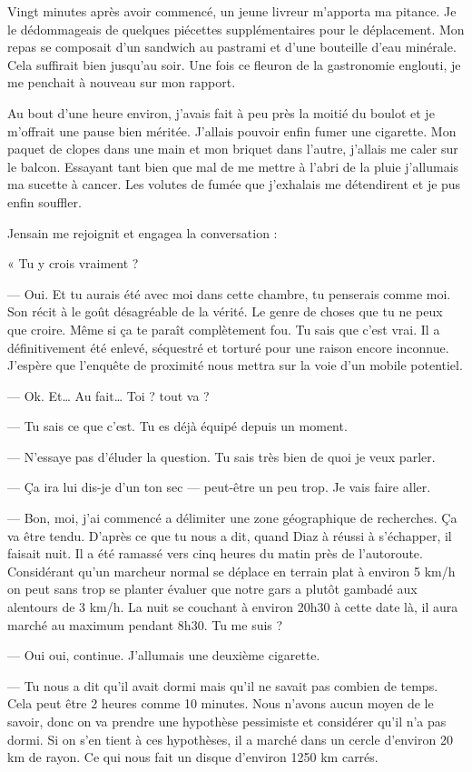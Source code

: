 Vingt minutes après avoir commencé, un jeune livreur m'apporta ma pitance. Je le dédommageais de quelques piécettes 
supplémentaires pour le déplacement. Mon repas se composait d'un sandwich au pastrami et d'une bouteille d'eau 
minérale. Cela suffirait bien jusqu'au soir. Une fois ce fleuron de la gastronomie englouti, je me penchait à 
nouveau sur mon rapport.

Au bout d'une heure environ, j'avais fait à peu près la moitié du boulot et je m'offrait une pause bien méritée. 
J'allais pouvoir enfin fumer une cigarette. Mon paquet de clopes dans une main et mon briquet dans l'autre, j'allais me 
caler sur le balcon. Essayant tant bien que mal de me mettre à l'abri de la pluie j'allumais ma sucette à cancer. Les 
volutes de fumée que j'exhalais me détendirent et je pus enfin souffler. 

Jensain me rejoignit et engagea la conversation :

« Tu y crois vraiment ?

— Oui. Et tu aurais été avec moi dans cette chambre, tu penserais comme moi. Son récit à le goût désagréable de la 
vérité. Le genre de choses que tu ne peux que croire. Même si ça te paraît complètement fou. Tu sais que c'est vrai. Il 
a définitivement été enlevé, séquestré et torturé pour une raison encore inconnue. J'espère que l'enquête de proximité 
nous mettra sur la voie d'un mobile potentiel.

— Ok. Et… Au fait… Toi ? tout va ?

— Tu sais ce que c'est. Tu es déjà équipé depuis un moment.

— N'essaye pas d'éluder la question. Tu sais très bien de quoi je veux parler.

— Ça ira lui dis-je d'un ton sec — peut-être un peu trop. Je vais faire aller. 

— Bon, moi, j'ai commencé a délimiter une zone géographique de recherches. Ça va être tendu. D'après ce que tu nous a 
dit, quand Diaz à réussi à s'échapper, il faisait nuit. Il a été ramassé vers cinq heures du matin près de l'autoroute. 
Considérant qu'un marcheur normal se déplace en terrain plat à environ 5 km/h on peut sans trop se planter évaluer 
que notre gars a plutôt gambadé aux alentours de  3 km/h. La nuit se couchant à environ 20h30 à cette date là, il 
aura marché au maximum pendant 8h30. Tu me suis ?

— Oui oui, continue. J'allumais une deuxième cigarette.

— Tu nous a dit qu'il avait dormi mais qu'il ne savait pas combien de temps. Cela peut être 2 heures comme 10 minutes. 
Nous n'avons aucun moyen de le savoir, donc on va prendre une hypothèse pessimiste et considérer qu'il n'a pas dormi. 
Si on s'en tient à ces hypothèses, il a marché dans un cercle d'environ 20 km de rayon. Ce qui nous fait un disque 
d'environ 1250 km carrés.

